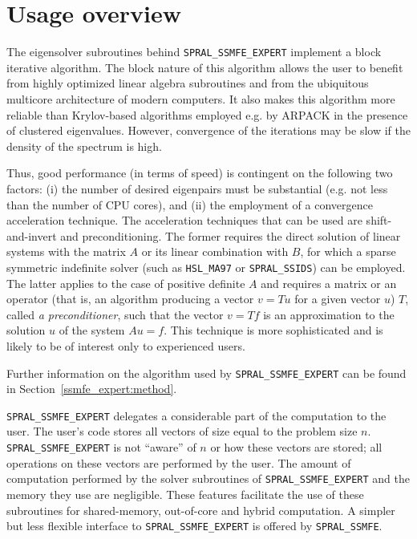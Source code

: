 \section{Usage overview}

The eigensolver subroutines
behind \texttt{SPRAL\_SSMFE\_EXPERT}
implement a block iterative algorithm.
The block nature of this algorithm allows the user
to benefit from highly optimized linear algebra subroutines
and from the ubiquitous multicore architecture
of modern computers.
It also makes this algorithm more reliable
than Krylov-based algorithms employed e.g. by ARPACK
in the presence of clustered eigenvalues.
However, convergence of the iterations may be slow
if the density of the spectrum is high.

Thus, good performance 
(in terms of speed)
is contingent on the following two factors:
(i) the number of desired
eigenpairs must be substantial
(e.g. not less than the number of CPU cores),
and
(ii) the employment of a convergence acceleration technique.
The acceleration techniques that can be used 
are shift-and-invert and preconditioning.
The former requires
the direct solution of linear systems
with the matrix $A$ or its linear combination with $B$,
for which a sparse symmetric indefinite solver
(such as {\tt HSL\_MA97} or {\tt SPRAL\_SSIDS}) can be employed.
The latter applies to the case of positive definite $A$ and
requires a matrix or an operator (that is, an algorithm producing a vector $v = T u$ for a given
vector $u$)
$T$, called {\em a preconditioner},
such that the vector
$v = T f$ is an approximation to the solution $u$
of the system $A u = f$.
This technique is more sophisticated
and is likely to be of interest only to experienced users.

Further information on the algorithm used by
\texttt{SPRAL\_SSMFE\_EXPERT} can be found in Section~\ref{ssmfe_expert:method}.

\texttt{SPRAL\_SSMFE\_EXPERT}
delegates 
a considerable part of the computation to the user.
The user's code stores all  vectors  of size equal to the problem size $n$.
\texttt{SPRAL\_SSMFE\_EXPERT}
is not ``aware'' of $n$ or how these vectors are stored; 
all operations on these vectors are performed by the user.
The amount of computation performed by 
the solver subroutines of \texttt{SPRAL\_SSMFE\_EXPERT}
and the memory they use are negligible. 
These features facilitate the use of these subroutines
for shared-memory, out-of-core and hybrid computation.
A simpler but less flexible interface to
\texttt{SPRAL\_SSMFE\_EXPERT}
is offered by \texttt{SPRAL\_SSMFE}.

